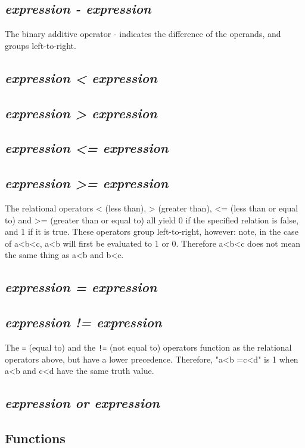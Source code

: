 \subsection{\textit{expression - expression}}
The binary additive operator - indicates the difference of the operands, and groups left-to-right.

\subsection{\textit{expression < expression}}
\subsection{\textit{expression > expression}}
\subsection{\textit{expression <= expression}}
\subsection{\textit{expression >= expression}}
The relational operators < (less than), > (greater than), <= (less than or equal to) and >= (greater than or equal to) all yield 0 if the specified relation is false, and 1 if it is true. These operators group left-to-right, however: note, in the case of a<b<c, a<b will first be evaluated to 1 or 0. Therefore a<b<c does not mean the same thing as a<b and b<c.

\subsection{\textit{expression = expression}}
\subsection{\textit{expression != expression}}
The \texttt{=} (equal to) and the \texttt{!=} (not equal to) operators function as the relational operators above, but have a lower precedence. Therefore, "a<b =c<d" is 1 when a<b and c<d have the same truth value. 

\subsection{\textit{expression or expression}}

\subsection{Functions}

